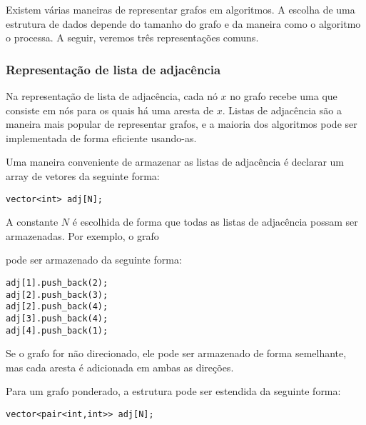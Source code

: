 Existem várias maneiras de representar grafos em algoritmos. A escolha de uma estrutura de dados depende do tamanho do grafo e da maneira como o algoritmo o processa. A seguir, veremos três representações comuns.

\subsubsection{Representação de lista de adjacência}


Na representação de lista de adjacência, cada nó $x$ no grafo recebe uma  que consiste em nós para os quais há uma aresta de $x$. Listas de adjacência são a maneira mais popular de representar grafos, e a maioria dos algoritmos pode ser implementada de forma eficiente usando-as.

Uma maneira conveniente de armazenar as listas de adjacência é declarar um array de vetores da seguinte forma:
\begin{lstlisting}
vector<int> adj[N];
\end{lstlisting}

A constante $N$ é escolhida de forma que todas as listas de adjacência possam ser armazenadas. Por exemplo, o grafo

\begin{center}
\end{center}
pode ser armazenado da seguinte forma:
\begin{lstlisting}
adj[1].push_back(2);
adj[2].push_back(3);
adj[2].push_back(4);
adj[3].push_back(4);
adj[4].push_back(1);
\end{lstlisting}

Se o grafo for não direcionado, ele pode ser armazenado de forma semelhante, mas cada aresta é adicionada em ambas as direções.

Para um grafo ponderado, a estrutura pode ser estendida da seguinte forma:

\begin{lstlisting}
vector<pair<int,int>> adj[N];
\end{lstlisting}


